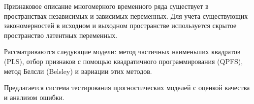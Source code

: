 \documentclass{article}
\begin{document}
    Признаковое описание многомерного временного ряда существует в пространствах независимых и зависимых переменных. Для учета существующих закономерностей в исходном и выходном пространстве используется скрытое пространство латентных переменных. 
    
    Рассматриваются следующие модели: метод частичных наименьших квадратов (PLS), отбор признаков с помощью квадратичного программирования (QPFS), метод Белсли (Belsley) и вариации этих методов.
    
	Предлагается система тестирования прогностических моделей с оценкой качества и анализом ошибки.

\iffalse	
\begin{thebibliography}{1}
	\bibitem{PCAandfriends}
	\url{https://www.math.uwaterloo.ca/~aghodsib/courses/f06stat890/readings/tutorial_stat890.pdf}
	\bibitem{PLS}
	\url{https://www.utdallas.edu/~herve/Abdi-PLS-pretty.pdf}
	\bibitem{QPFS}
	\url{http://www.jmlr.org/papers/volume11/rodriguez-lujan10a/rodriguez-lujan10a.pdf}
\end{thebibliography}
\fi
\end{document}

